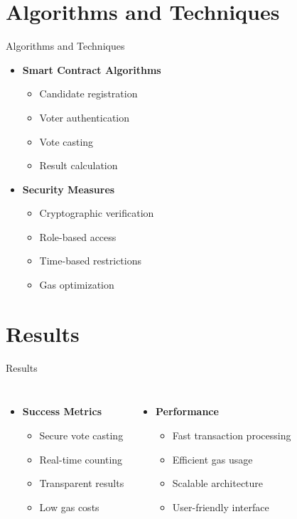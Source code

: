 \documentclass{beamer}
\begin{document}
\section{Algorithms and Techniques}
\begin{frame}{Algorithms and Techniques}
  \begin{itemize}
    \item \textbf{Smart Contract Algorithms}
      \begin{itemize}
        \item Candidate registration
        \item Voter authentication
        \item Vote casting
        \item Result calculation
      \end{itemize}
    \item \textbf{Security Measures}
      \begin{itemize}
        \item Cryptographic verification
        \item Role-based access
        \item Time-based restrictions
        \item Gas optimization
      \end{itemize}
  \end{itemize}
\end{frame}

\section{Results}
\begin{frame}{Results}
  \begin{columns}
    \begin{itemize}
      \item \textbf{Success Metrics}
        \begin{itemize}
          \item Secure vote casting
          \item Real-time counting
          \item Transparent results
          \item Low gas costs
        \end{itemize}
    \end{itemize}
    \begin{itemize}
      \item \textbf{Performance}
        \begin{itemize}
          \item Fast transaction processing
          \item Efficient gas usage
          \item Scalable architecture
          \item User-friendly interface
        \end{itemize}
    \end{itemize}
  \end{columns}
\end{frame}
\end{document}
